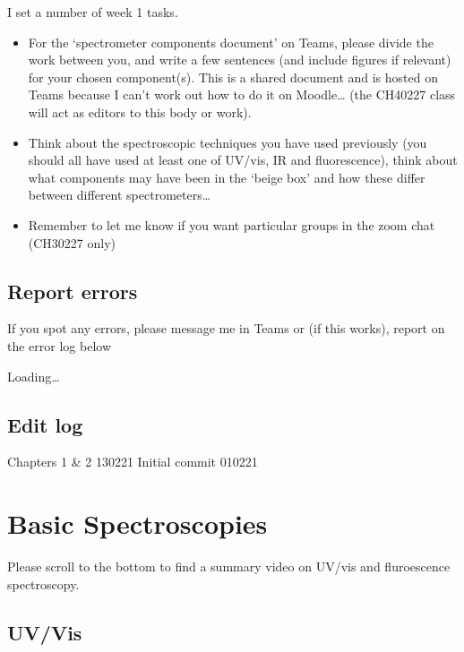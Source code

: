 \documentclass[
]{book}
\begin{document}
I set a number of week 1 tasks.

\begin{itemize}
\item
  For the `spectrometer components document' on Teams, please divide the work between you, and write a few sentences (and include figures if relevant) for your chosen component(s). This is a shared document and is hosted on Teams because I can't work out how to do it on Moodle\ldots{} (the CH40227 class will act as editors to this body or work).
\item
  Think about the spectroscopic techniques you have used previously (you should all have used at least one of UV/vis, IR and fluorescence), think about what components may have been in the `beige box' and how these differ between different spectrometers\ldots{}
\item
  Remember to let me know if you want particular groups in the zoom chat (CH30227 only)
\end{itemize}

\hypertarget{report-errors}{%
\section*{Report errors}\label{report-errors}}

If you spot any errors, please message me in Teams or (if this works), report on the error log below

Loading\ldots{}

\hypertarget{edit-log}{%
\section*{Edit log}\label{edit-log}}

Chapters 1 \& 2 130221
Initial commit 010221

\hypertarget{ch:UVvisfluorIR}{%
\chapter{Basic Spectroscopies}\label{ch:UVvisfluorIR}}

Please scroll to the bottom to find a summary video on UV/vis and fluroescence spectroscopy.

\hypertarget{sec:UV}{%
\section{UV/Vis}\label{sec:UV}}
\end{document}
